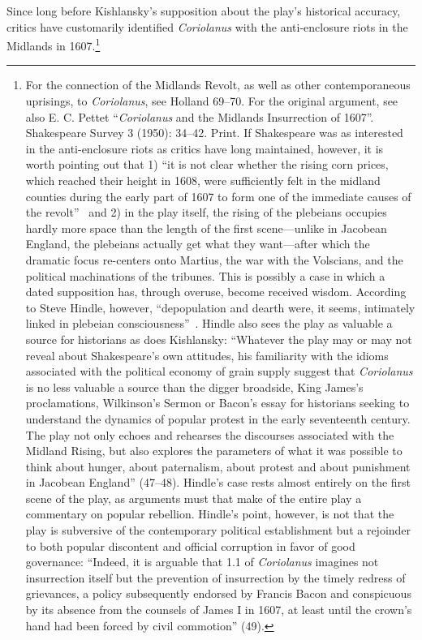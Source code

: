 Since long before Kishlansky's supposition about the play's historical accuracy, critics have customarily identified \emph{Coriolanus} with the anti-enclosure riots in the Midlands in 1607.\footnote{For the connection of the Midlands Revolt, as well as other contemporaneous uprisings, to \emph{Coriolanus}, see Holland 69--70. For the original argument, see also E. C. Pettet ``\emph{Coriolanus} and the Midlands Insurrection of 1607''. Shakespeare Survey 3 (1950): 34–42. Print. \nocite{pettet_coriolanus_1950} If Shakespeare was as interested in the anti-enclosure riots as critics have long maintained, however, it is worth pointing out that 1) ``it is not clear whether the rising corn prices, which reached their height in 1608, were sufficiently felt in the midland counties during the early part of 1607 to form one of the immediate causes of the revolt''~\cite[213]{gay_midland_1904} and 2) in the play itself, the rising of the plebeians occupies hardly more space than the length of the first scene---unlike in Jacobean England, the plebeians actually get what they want---after which the dramatic focus re-centers onto Martius, the war with the Volscians, and the political machinations of the tribunes.
This is possibly a case in which a dated supposition has, through overuse, become received wisdom.
According to Steve Hindle, however, ``depopulation and dearth were, it seems, intimately linked in plebeian consciousness''~\cite[27]{hindle_imagining_2008}.
Hindle also sees the play as valuable a source for historians as does Kishlansky: ``Whatever the play may or may not reveal about Shakespeare's own attitudes, his familiarity with the idioms associated with the political economy of grain supply suggest that \emph{Coriolanus} is no less valuable a source than the digger broadside, King James's proclamations, Wilkinson's Sermon or Bacon's essay for historians seeking to understand the dynamics of popular protest in the early seventeenth century.
The play not only echoes and rehearses the discourses associated with the Midland Rising, but also explores the parameters of what it was possible to think about hunger, about paternalism, about protest and about punishment in Jacobean England'' (47--48).
Hindle's case rests almost entirely on the first scene of the play, as arguments must that make of the entire play a commentary on popular rebellion.
Hindle's point, however, is not that the play is subversive of the contemporary political establishment but a rejoinder to both popular discontent and official corruption in favor of good governance: ``Indeed, it is arguable that 1.1 of \emph{Coriolanus} imagines not insurrection itself but the prevention of insurrection by the timely redress of grievances, a policy subsequently endorsed by Francis Bacon and conspicuous by its absence from the counsels of James I in 1607, at least until the crown's hand had been forced by civil commotion'' (49).}
